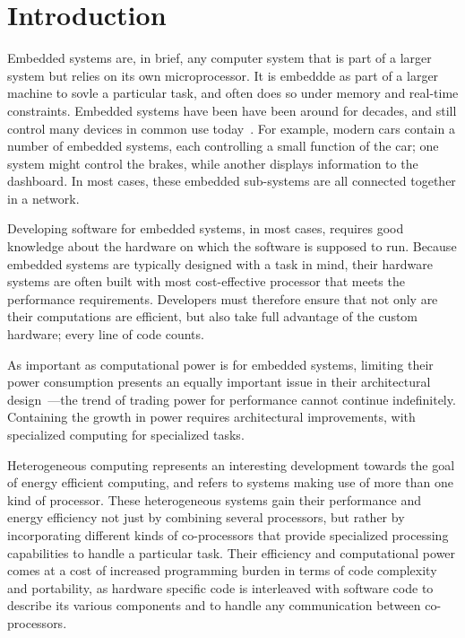 \documentclass[../paper.tex]{subfiles}
\begin{document}
\chapter{Introduction}
\label{intro}

Embedded systems are, in brief, any computer system that is part of a larger system but relies on its own microprocessor. It is embeddde as part of a larger machine to sovle a particular task, and often does so under memory and real-time constraints. Embedded systems have been have been around for decades, and still control many devices in common use today~\cite{barr2006}. For example, modern cars contain a number of embedded systems, each controlling a small function of the car; one system might control the brakes, while another displays information to the dashboard. In most cases, these embedded sub-systems are all connected together in a network. 

Developing software for embedded systems, in most cases, requires good knowledge about the hardware on which the software is supposed to run. Because embedded systems are typically designed with a task in mind, their hardware systems are often built with most cost-effective processor that meets the performance requirements. Developers must therefore ensure that not only are their computations are efficient, but also take full advantage of the custom hardware; every line of code counts.

As important as computational power is for embedded systems, limiting their power consumption presents an equally important issue in their architectural design~\cite{mudge2001}---the trend of trading power for performance cannot continue indefinitely. Containing the growth in power requires architectural improvements, with specialized computing for specialized tasks.

Heterogeneous computing represents an interesting development towards the goal of energy efficient computing, and refers to systems making use of more than one kind of processor. These heterogeneous systems gain their performance and energy efficiency not just by combining several processors, but rather by incorporating different kinds of co-processors that provide specialized processing capabilities to handle a particular task. Their efficiency and computational power comes at a cost of increased programming burden in terms of code complexity and portability, as hardware specific code is interleaved with software code to describe its various components and to handle any communication between co-processors.
\end{document}
